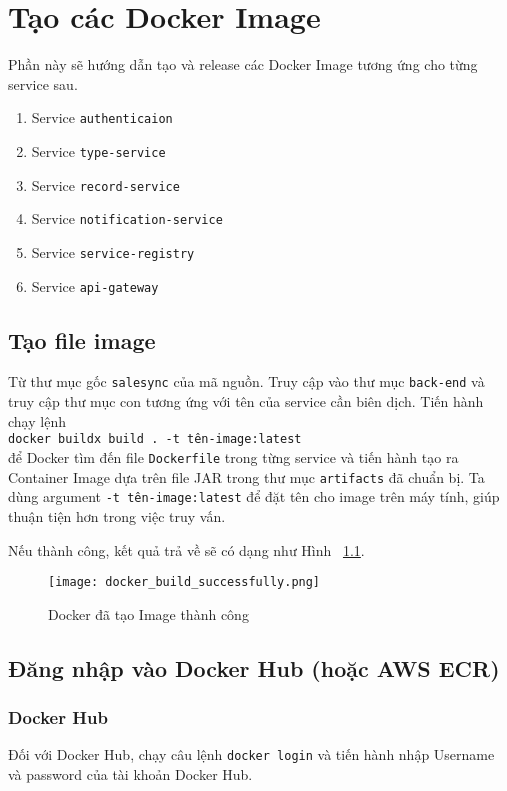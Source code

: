 \chapter{Tạo các Docker Image}
\label{Chapter2}
Phần này sẽ hướng dẫn tạo và release các Docker Image tương ứng cho từng service sau.
\begin{enumerate}
    \item Service \texttt{{authenticaion}}
    \item Service \texttt{type-service}
    \item Service \texttt{record-service}
    \item Service \texttt{notification-service}
    \item Service \texttt{service-registry}
    \item Service \texttt{api-gateway}
\end{enumerate}

\section{Tạo file image}
Từ thư mục gốc \texttt{salesync} của mã nguồn. Truy cập vào thư mục \texttt{back-end} và truy cập thư mục con tương ứng với tên của service cần biên dịch.
Tiến hành chạy lệnh \\
\texttt{docker buildx build . -t tên-image:latest}\\
để Docker tìm đến file \texttt{Dockerfile} trong từng service và tiến hành tạo ra Container Image dựa trên file JAR trong thư mục \texttt{artifacts} đã chuẩn bị. Ta dùng argument \texttt{-t tên-image:latest} để đặt tên cho image trên máy tính, giúp thuận tiện hơn trong việc truy vấn.

Nếu thành công, kết quả trả về sẽ có dạng như Hình ~\ref{fig:docker_build_successfully}.

\begin{figure}
    \centering
    \texttt{[image: docker\_build\_successfully.png]}
    \caption{Docker đã tạo Image thành công}
    \label{fig:docker_build_successfully}
\end{figure}

\section{Đăng nhập vào Docker Hub (hoặc AWS ECR)}
\subsection{Docker Hub}
Đối với Docker Hub, chạy câu lệnh \texttt{docker login} và tiến hành nhập Username và password của tài khoản Docker Hub.

